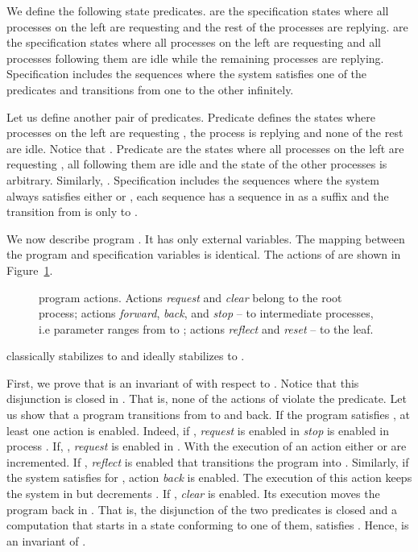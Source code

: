 \documentclass[11pt]{llncs}
\def\Proof{\par\noindent{\bf Proof:}\indent}
\def\PROG#1{}
\begin{document}
We define the following state predicates.  are the
specification states where all  processes on the left are
requesting  and the rest of the processes are
replying.  are the specification states where all 
processes on the left are requesting  and all 
processes following them are idle  while the remaining
processes are replying. Specification \PROG{SPIF} includes the
sequences where the system satisfies one of the predicates and
transitions from one to the other infinitely.

Let us define another pair of predicates. Predicate  defines
the states where  processes on the left are requesting ,
the process  is replying and none of the rest are idle. Notice
that . Predicate  are the states where
all  processes on the left are requesting , all 
following them are idle  and the state of the other
processes is arbitrary. Similarly, . Specification \PROG{IPIF} includes the sequences where the
system always satisfies either  or , each sequence
has a sequence in \PROG{SPIF} as a suffix and the transition from
 is only to .

We now describe program \PROG{PIF}. It has only external
variables. The mapping between the program and specification variables
is identical. The actions of \PROG{PIF} are shown in
Figure~\ref{figPIF}.

\begin{figure}

\caption{\PROG{PIF} program actions. Actions \emph{request} and
  \emph{clear} belong to the root process; actions \emph{forward},
  \emph{back}, and \emph{stop} -- to intermediate processes, i.e
  parameter  ranges from  to ; actions \emph{reflect} and
  \emph{reset} -- to the leaf.  }\label{figPIF}
\end{figure}

\begin{theorem}
\PROG{PIF} classically stabilizes to \PROG{SPIF} and ideally
stabilizes to \PROG{IPIF}.
\end{theorem}

\Proof First, we prove that  is an invariant of
\PROG{PIF} with respect to \PROG{SPIF}.  Notice that this disjunction
is closed in \PROG{PIF}. That is, none of the actions of \PROG{PIF}
violate the predicate. Let us show that a program transitions from
 to  and back. If the program satisfies , at
least one action is enabled. Indeed, if , \emph{request} is
enabled in \emph{stop} is enabled in process . If,
, \emph{request} is enabled in . With the
execution of an action either  or  are incremented. If , \emph{reflect} is enabled that transitions the program into
. Similarly, if the system satisfies  for ,
action \emph{back} is enabled. The execution of this action keeps the
system in  but decrements . If , \emph{clear} is
enabled. Its execution moves the program back in . That is,
the disjunction of the two predicates is closed and a \PROG{PIF}
computation that starts in a state conforming to one of them,
satisfies \PROG{SPIF}. Hence,  is an invariant of
\PROG{SPIF}.
\end{document}
